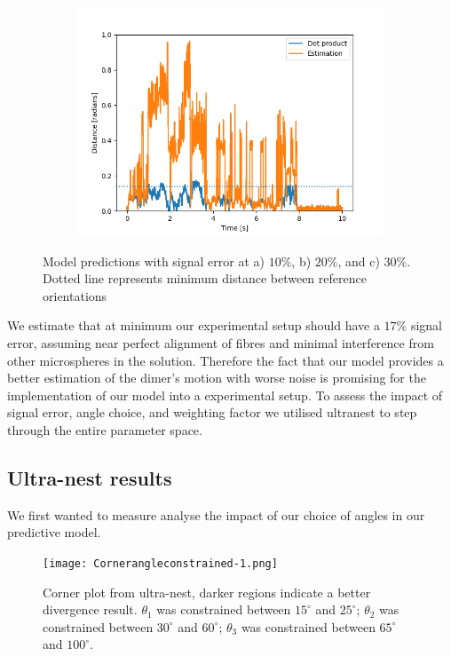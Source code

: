 \documentclass[final,3p, twocolumn]{elsarticle}
\begin{document}
\begin{figure}[t]
\begin{subfigure}{0.33\textwidth}
		\includegraphics[width=\textwidth]{Error_30_percent.png}
	\end{subfigure}
	\caption{Model predictions with signal error at a) $10 \%$, b)  $20\%$, and c) $30\%$. Dotted line represents minimum distance between reference orientations}
\end{figure}

We estimate that at minimum our experimental setup should have a $17\%$ signal error, assuming near perfect alignment of fibres and minimal interference from other microspheres in the solution. Therefore the fact that our model provides a better estimation of the dimer's motion with worse noise is promising for the implementation of our model into a experimental setup. To assess the impact of signal error, angle choice, and weighting factor we utilised ultranest to step through the entire parameter space. 

\subsection{Ultra-nest results}
\label{3.3}
We first wanted to measure analyse the impact of our choice of angles in our predictive model. 

\begin{figure} [t]
	\centering
	\texttt{[image: Cornerangleconstrained-1.png]}
	\caption{Corner plot from ultra-nest, darker regions indicate a better divergence result. $\theta_1$ was constrained between $15^{\circ}$ and $25^{\circ}$; $\theta_2$ was constrained between $30^{\circ}$ and $60^{\circ}$; $\theta_3$ was constrained between $65^{\circ}$ and $100^{\circ}$.}
\end{figure}
\end{document}

